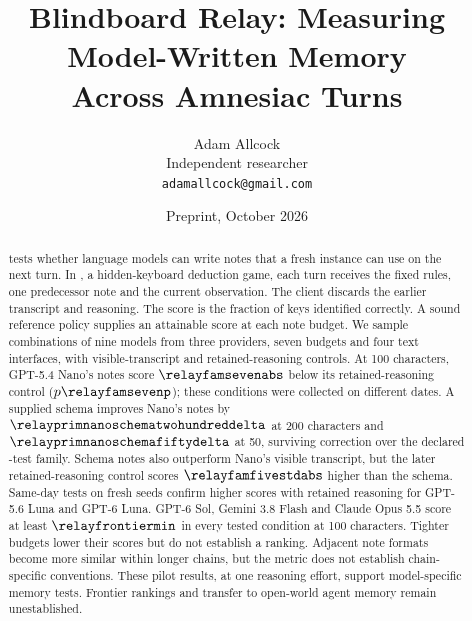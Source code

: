 \documentclass[11pt]{article}
\title{Blindboard Relay: Measuring Model-Written Memory\\
Across Amnesiac Turns}
\author{Adam Allcock\\
Independent researcher\\
\texttt{adamallcock@gmail.com}}
\date{Preprint, October 2026}
\newcommand{\blindboard}{\benchmarkname{Blindboard}}
\newcommand{\relay}{\benchmarkname{Blindboard Relay}}
\begin{document}
\maketitle

\begin{abstract}
\relay{} tests whether language models can write notes that a fresh instance can use on the next turn. In \blindboard{}, a hidden-keyboard deduction game, each turn receives the fixed rules, one predecessor note and the current observation. The client discards the earlier transcript and reasoning. The score is the fraction of keys identified correctly. A sound reference policy supplies an attainable score at each note budget. We sample combinations of nine models from three providers, seven budgets and four text interfaces, with visible-transcript and retained-reasoning controls. At 100 characters, GPT-5.4 Nano's notes score $\relayfamsevenabs$ below its retained-reasoning control ($p\relayfamsevenp$); these conditions were collected on different dates. A supplied schema improves Nano's notes by $\relayprimnanoschematwohundreddelta$ at 200 characters and $\relayprimnanoschemafiftydelta$ at 50, surviving correction over the declared \relayprimfamily-test family. Schema notes also outperform Nano's visible transcript, but the later retained-reasoning control scores $\relayfamfivestdabs$ higher than the schema. Same-day tests on fresh seeds confirm higher scores with retained reasoning for GPT-5.6 Luna and GPT-6 Luna. GPT-6 Sol, Gemini 3.8 Flash and Claude Opus 5.5 score at least $\relayfrontiermin$ in every tested condition at 100 characters. Tighter budgets lower their scores but do not establish a ranking. Adjacent note formats become more similar within longer chains, but the metric does not establish chain-specific conventions. These pilot results, at one reasoning effort, support model-specific memory tests. Frontier rankings and transfer to open-world agent memory remain unestablished.
\end{abstract}

\clearpage










\clearpage
\appendix
{}


\clearpage


\end{document}
